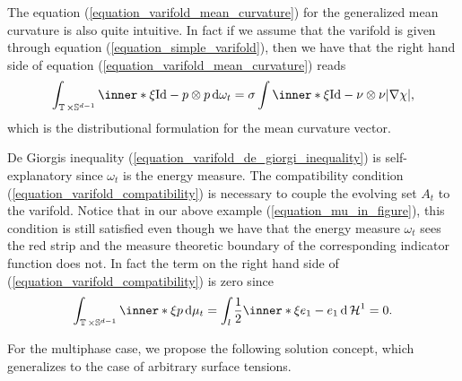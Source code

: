 The equation (\ref{equation_varifold_mean_curvature}) for the generalized mean 
curvature is also quite intuitive. In fact if we
assume that the varifold is given through equation 
(\ref{equation_simple_varifold}), then we have that the right hand side of 
equation 
(\ref{equation_varifold_mean_curvature}) reads
\begin{equation*}
	\int_{ \flattorus \times \mathbb{ S }^{ d - 1 } }
	\inner*{ \xi }{ \mathrm{Id} - p \otimes p }
	\dd{ \omega_{ t } }
	=
	\sigma
	\int
	\inner*{ \xi }{\mathrm{Id} - \nu \otimes \nu }
	\abs{ \nabla \chi },
\end{equation*}
which is the distributional formulation for the mean curvature vector.

De Giorgis inequality (\ref{equation_varifold_de_giorgi_inequality}) is 
self-explanatory since $ \omega_{ t } $ is the energy measure. The 
compatibility condition (\ref{equation_varifold_compatibility}) is necessary to 
couple the evolving set $ A_{ t } $ to 
the varifold. Notice that in our above example (\ref{equation_mu_in_figure}), 
this condition is still satisfied even though we have that the energy measure $ 
\omega_{ t } $ sees the red strip 
and the measure theoretic boundary of the corresponding indicator function does 
not. In fact the term on the right hand side of 
(\ref{equation_varifold_compatibility}) 
is zero since
\begin{equation*}
	\int_{ \flattorus \times \mathbb{ S }^{ d - 1 } }
	\inner*{ \xi }{ p }
	\dd{ \mu_{ t } }
	=
	\int_{ l }
	\frac{ 1 }{ 2 }
	\inner*{ \xi }{ e_{ 1 } - e_{ 1 } }
	\dd{ \hm^{ 1 } }
	= 
	0.
\end{equation*}

For the multiphase case, we propose the following solution concept, which 
generalizes
\cite[Def.~2]{hensel_laux_varifold_solution_concept_for_mean_curvature_flow} to 
the case of arbitrary surface tensions.

